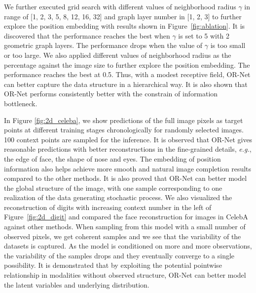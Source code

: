 \documentclass[sigconf]{acmart} %
\newcommand{\eg}{\textit{e.g.}}
\begin{document}
We further executed grid search with different values of neighborhood radius $\gamma$ in range of [1, 2, 3, 5, 8, 12, 16, 32] and graph layer number in [1, 2, 3] to further explore the position embedding with results shown in Figure~\ref{fig:ablation}. 
It is discovered that the performance reaches the best when $\gamma$ is set to 5 with 2 geometric graph layers. The performance drops when the value of $\gamma$ is too small or too large. We also applied different values of neighborhood radius as the percentage against the image size to further explore the position embedding. The performance reaches the best at 0.5. Thus, with a modest receptive field, OR-Net can better capture the data structure in a hierarchical way.
It is also shown that OR-Net performs consistently better with the constrain of information bottleneck.


In Figure \ref{fig:2d_celeba}, we show predictions of the full image pixels as target points at different training stages chronologically for randomly selected images. 100 context points are sampled for the inference. It is observed that OR-Net gives reasonable predictions with better reconstructions in the fine-grained details, \eg, the edge of face, the shape of nose and eyes. The embedding of position information also helps achieve more smooth and natural image completion results compared to the other methods. It is also proved that OR-Net can better model the global structure of the image, with one sample corresponding to one realization of the data generating stochastic process. We also visualized the reconstruction of digits with increasing context number in the left of Figure~\ref{fig:2d_digit} and compared the face reconstruction for images in CelebA against other methods.
When sampling from this model with a small number of observed pixels, we get coherent samples and we see that the variability of the datasets is captured. As the model is conditioned on more and more observations, the variability of the samples drops and they eventually converge to a single possibility. It is demonstrated that by exploiting the potential pointwise relationship in modalities without observed structure, OR-Net can better model the latent variables and underlying distribution.  
\end{document}
